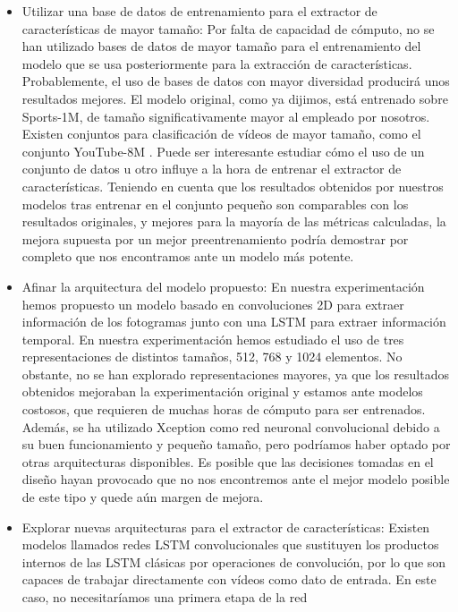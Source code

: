 \documentclass[../main.tex]{memoir}
\begin{document}
\begin{itemize}
\item Utilizar una base de datos de entrenamiento para el extractor de
  características de mayor tamaño: Por falta de capacidad de cómputo,
  no se han utilizado bases de datos de mayor tamaño para el
  entrenamiento del modelo que se usa posteriormente para la
  extracción de características. Probablemente, el uso de bases de
  datos con mayor diversidad producirá unos resultados mejores. El
  modelo original, como ya dijimos, está entrenado sobre Sports-1M, de
  tamaño significativamente mayor al empleado por nosotros. Existen
  conjuntos para clasificación de vídeos de mayor tamaño, como el
  conjunto YouTube-8M \cite{abu2016youtube}. Puede ser interesante
  estudiar cómo el uso de un conjunto de datos u otro influye a la
  hora de entrenar el extractor de características. Teniendo en cuenta
  que los resultados obtenidos por nuestros modelos tras entrenar en
  el conjunto pequeño son comparables con los resultados originales, y
  mejores para la mayoría de las métricas calculadas, la mejora
  supuesta por un mejor preentrenamiento podría demostrar por completo
  que nos encontramos ante un modelo más potente.
\item Afinar la arquitectura del modelo propuesto: En nuestra
  experimentación hemos propuesto un modelo basado en convoluciones 2D
  para extraer información de los fotogramas junto con una LSTM para
  extraer información temporal. En nuestra experimentación hemos
  estudiado el uso de tres representaciones de distintos tamaños, 512,
  768 y 1024 elementos. No obstante, no se han explorado
  representaciones mayores, ya que los resultados obtenidos mejoraban
  la experimentación original y estamos ante modelos costosos, que
  requieren de muchas horas de cómputo para ser entrenados. Además, se
  ha utilizado Xception como red neuronal convolucional debido a su
  buen funcionamiento y pequeño tamaño, pero podríamos haber optado
  por otras arquitecturas disponibles. Es posible que las decisiones
  tomadas en el diseño hayan provocado que no nos encontremos ante el
  mejor modelo posible de este tipo y quede aún margen de mejora.
\item Explorar nuevas arquitecturas para el extractor de
  características: Existen modelos llamados redes LSTM convolucionales
  \cite{xingjian2015convolutional} que sustituyen los productos
  internos de las LSTM clásicas por operaciones de convolución, por lo
  que son capaces de trabajar directamente con vídeos como dato de
  entrada. En este caso, no necesitaríamos una primera etapa de la red

\end{itemize}
\end{document}
